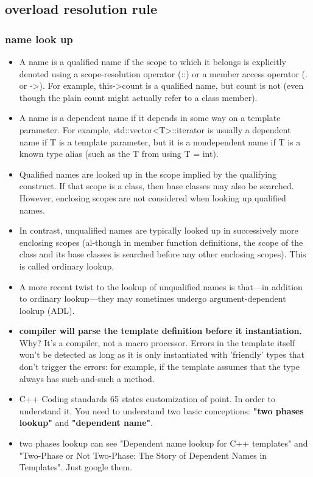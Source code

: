 \documentclass[a4paper,11pt,twoside]{book}
\begin{document}
\subsection{overload resolution rule}
\subsubsection{name look up}
\begin{itemize}
    \item A name is a qualified name if the scope to which it belongs is explicitly denoted using a scope-resolution operator (::) or a member access operator (. or ->). For example, this->count is a qualified name, but count is not (even though the plain count might actually refer to a class member).  

    \item  A name is a dependent name if it depends in some way on a template parameter.  For example, std::vector<T>::iterator is usually a dependent name if T is a template parameter, but it is a nondependent name if T is a known type alias (such as the T from using T = int).

        \item Qualified names are looked up in the scope implied by the qualifying construct. If that scope is a class, then base classes may also be searched. However, enclosing scopes are not considered when looking up qualified names. 

        \item In contrast, unqualified names are typically looked up in successively more enclosing scopes (al-though in member function definitions, the scope of the class and its base classes is searched before any other enclosing scopes). This is called ordinary lookup. 

        \item A more recent twist to the lookup of unqualified names is that—in addition to ordinary lookup—they may sometimes undergo argument-dependent lookup (ADL).
            
    \item \textbf{compiler will parse the template definition before it instantiation.} Why? It's a compiler, not a macro processor. Errors in the template itself won't be detected as long as it is only instantiated with 'friendly' types that don't trigger the errors: for example, if the template assumes that the type always has such-and-such a method.

    \item C++ Coding standards 65 states customization of point. In order to understand it. You need to understand two basic conceptions: \textbf{"two phases lookup"} and \textbf{"dependent name"}.  

    \item two phases lookup can see "Dependent name lookup for C++ templates" and "Two-Phase or Not Two-Phase: The Story of Dependent Names in Templates". Just google them.
\end{itemize}
\end{document}
